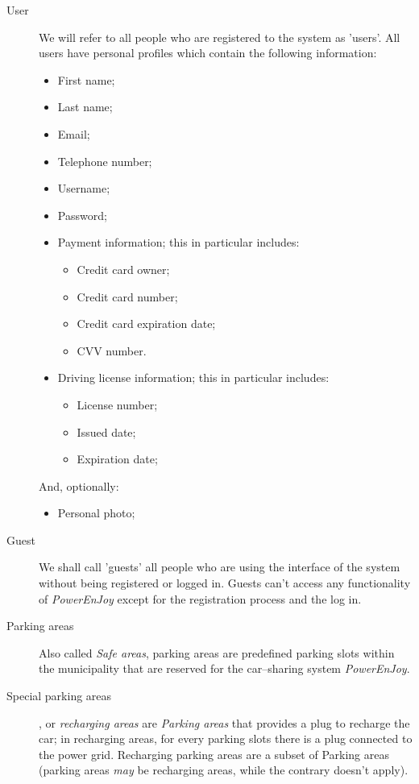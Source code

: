 \begin{description}
				\item[User] We will refer to all people who are registered to the system as 'users'. All users have personal profiles which contain the following information:
				\begin{itemize}
					\item First name;
					\item Last name; 
					\item Email;
					\item Telephone number;
					\item Username;
					\item Password;
					\item Payment information; this in particular includes:
						\begin{itemize}
							\item Credit card owner;
							\item Credit card number;
							\item Credit card expiration date;
							\item CVV number.
						\end{itemize}
					\item Driving license information; this in particular includes:
						\begin{itemize}
							\item License number;
							\item Issued date;
							\item Expiration date;
						\end{itemize}
				\end{itemize}
				And, optionally:
				\begin{itemize}		
					\item Personal photo;
				\end{itemize}

				
				\item[Guest] We shall call 'guests' all people who are using the interface of the system without being registered or logged in. Guests can't access any functionality of \textit{PowerEnJoy} except for the registration process and the log in. 
				
				
				\item[Parking areas] Also called \textit{Safe areas}, parking areas are predefined parking slots within the municipality that are reserved for the car–sharing system \textit{PowerEnJoy}.
				\item[Special parking areas], or \textit{recharging areas} are \textit{Parking areas} that provides a plug to recharge the car; in recharging areas, for every parking slots there is a plug connected to the power grid. Recharging parking areas are a subset of Parking areas (parking areas \textit{may} be recharging areas, while the contrary doesn't apply).
				

\end{description}
